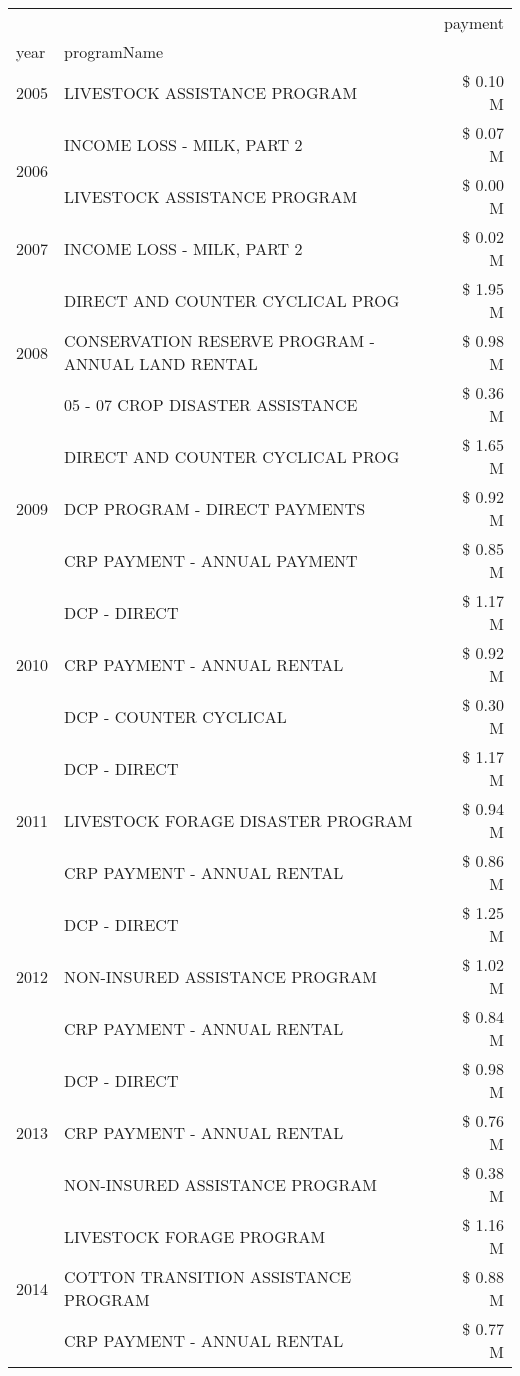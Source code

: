 \begin{tabular}{llr}
\toprule
 &  & payment \\
year & programName &  \\
\midrule
2005 & LIVESTOCK ASSISTANCE PROGRAM & \$ 0.10 M \\
\cline{1-3}
\multirow[t]{2}{*}{2006} & INCOME LOSS - MILK, PART 2 & \$ 0.07 M \\
 & LIVESTOCK ASSISTANCE PROGRAM & \$ 0.00 M \\
\cline{1-3}
2007 & INCOME LOSS - MILK, PART 2 & \$ 0.02 M \\
\cline{1-3}
\multirow[t]{3}{*}{2008} & DIRECT AND COUNTER CYCLICAL PROG & \$ 1.95 M \\
 & CONSERVATION RESERVE PROGRAM - ANNUAL LAND RENTAL & \$ 0.98 M \\
 & 05 - 07 CROP DISASTER ASSISTANCE & \$ 0.36 M \\
\cline{1-3}
\multirow[t]{3}{*}{2009} & DIRECT AND COUNTER CYCLICAL PROG & \$ 1.65 M \\
 & DCP PROGRAM - DIRECT PAYMENTS & \$ 0.92 M \\
 & CRP PAYMENT - ANNUAL PAYMENT & \$ 0.85 M \\
\cline{1-3}
\multirow[t]{3}{*}{2010} & DCP - DIRECT & \$ 1.17 M \\
 & CRP PAYMENT - ANNUAL RENTAL & \$ 0.92 M \\
 & DCP - COUNTER CYCLICAL & \$ 0.30 M \\
\cline{1-3}
\multirow[t]{3}{*}{2011} & DCP - DIRECT & \$ 1.17 M \\
 & LIVESTOCK FORAGE DISASTER PROGRAM & \$ 0.94 M \\
 & CRP PAYMENT - ANNUAL RENTAL & \$ 0.86 M \\
\cline{1-3}
\multirow[t]{3}{*}{2012} & DCP - DIRECT & \$ 1.25 M \\
 & NON-INSURED ASSISTANCE PROGRAM & \$ 1.02 M \\
 & CRP PAYMENT - ANNUAL RENTAL & \$ 0.84 M \\
\cline{1-3}
\multirow[t]{3}{*}{2013} & DCP - DIRECT & \$ 0.98 M \\
 & CRP PAYMENT - ANNUAL RENTAL & \$ 0.76 M \\
 & NON-INSURED ASSISTANCE PROGRAM & \$ 0.38 M \\
\cline{1-3}
\multirow[t]{3}{*}{2014} & LIVESTOCK FORAGE PROGRAM & \$ 1.16 M \\
 & COTTON TRANSITION ASSISTANCE PROGRAM & \$ 0.88 M \\
 & CRP PAYMENT - ANNUAL RENTAL & \$ 0.77 M \\

\end{tabular}
